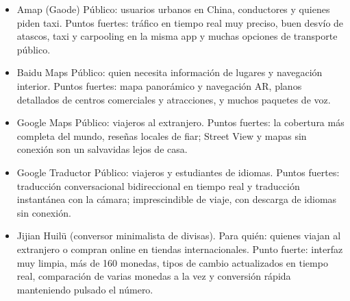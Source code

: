 
\begin{itemize}
  \item Amap (Gaode) Público: usuarios urbanos en China, conductores y quienes piden taxi. Puntos fuertes: tráfico en tiempo real muy preciso, buen desvío de atascos, taxi y carpooling en la misma app y muchas opciones de transporte público.
  \item Baidu Maps Público: quien necesita información de lugares y navegación interior. Puntos fuertes: mapa panorámico y navegación AR, planos detallados de centros comerciales y atracciones, y muchos paquetes de voz.
  \item Google Maps Público: viajeros al extranjero. Puntos fuertes: la cobertura más completa del mundo, reseñas locales de fiar; Street View y mapas sin conexión son un salvavidas lejos de casa.
\end{itemize}


\begin{itemize}
  \item Google Traductor Público: viajeros y estudiantes de idiomas. Puntos fuertes: traducción conversacional bidireccional en tiempo real y traducción instantánea con la cámara; imprescindible de viaje, con descarga de idiomas sin conexión.
\end{itemize}


\begin{itemize}
  \item Jijian Huilü (conversor minimalista de divisas). Para quién: quienes viajan al extranjero o compran online en tiendas internacionales. Punto fuerte: interfaz muy limpia, más de 160 monedas, tipos de cambio actualizados en tiempo real, comparación de varias monedas a la vez y conversión rápida manteniendo pulsado el número.
\end{itemize}



